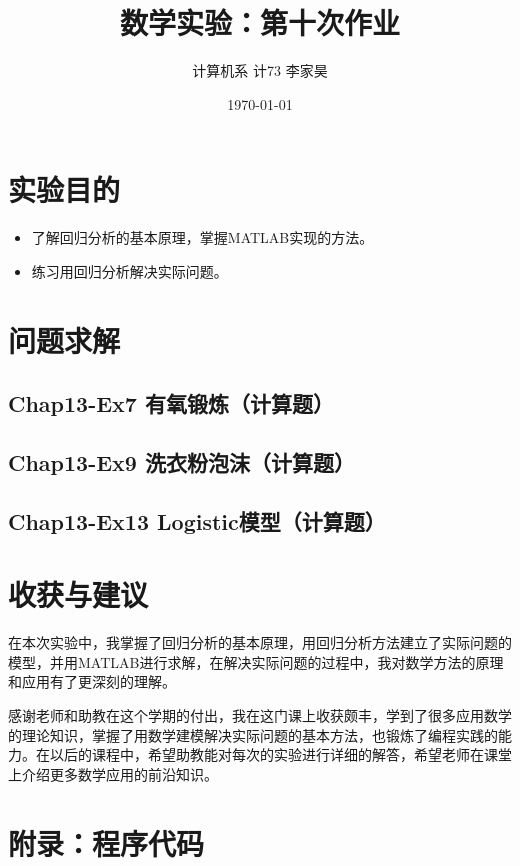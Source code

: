 \documentclass[12pt,a4paper]{article}
\title{数学实验：第十次作业}
\author{计算机系 \quad 计73 \quad 2017011620 \quad 李家昊}
\date{\today}
\begin{document}
\maketitle

\section{实验目的}

\begin{itemize}
    \item 了解回归分析的基本原理，掌握MATLAB实现的方法。
    \item 练习用回归分析解决实际问题。
\end{itemize}

\section{问题求解}

\subsection{Chap13-Ex7 有氧锻炼（计算题）}



\subsection{Chap13-Ex9 洗衣粉泡沫（计算题）}



\subsection{Chap13-Ex13 Logistic模型（计算题）}



\section{收获与建议}

在本次实验中，我掌握了回归分析的基本原理，用回归分析方法建立了实际问题的模型，并用MATLAB进行求解，在解决实际问题的过程中，我对数学方法的原理和应用有了更深刻的理解。

感谢老师和助教在这个学期的付出，我在这门课上收获颇丰，学到了很多应用数学的理论知识，掌握了用数学建模解决实际问题的基本方法，也锻炼了编程实践的能力。在以后的课程中，希望助教能对每次的实验进行详细的解答，希望老师在课堂上介绍更多数学应用的前沿知识。

\section{附录：程序代码}
\end{document}
